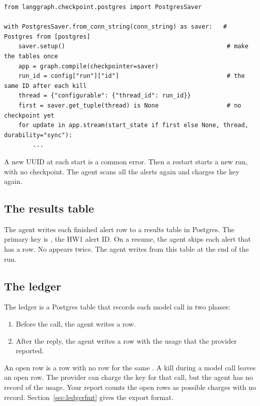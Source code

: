 \documentclass[9pt,letterpaper]{article}
\begin{document}
\begin{verbatim}
from langgraph.checkpoint.postgres import PostgresSaver

with PostgresSaver.from_conn_string(conn_string) as saver:   # Postgres from [postgres]
    saver.setup()                                             # make the tables once
    app = graph.compile(checkpointer=saver)
    run_id = config["run"]["id"]                              # the same ID after each kill
    thread = {"configurable": {"thread_id": run_id}}
    first = saver.get_tuple(thread) is None                   # no checkpoint yet
    for update in app.stream(start_state if first else None, thread, durability="sync"):
        ...
\end{verbatim}

A new UUID at each start is a common error. Then a restart starts a new run, with
no checkpoint. The agent scans all the alerts again and charges the key again.

\subsection{The results table}\label{sec:results}

The agent writes each finished alert row to a results table in Postgres. The
primary key is , the HW1 alert ID. On a resume, the agent skips
each alert that has a row. No  appears twice. The agent writes
 from this table at the end of the run.

\subsection{The ledger}\label{sec:ledger}

The ledger is a Postgres table that records each model call in two phases:
\begin{enumerate}
\item Before the call, the agent writes a  row.
\item After the reply, the agent writes a  row with the usage
  that the provider reported.
\end{enumerate}
An open row is a  row with no  row for
the same . A kill during a model call leaves an open row. The
provider can charge the key for that call, but the agent has no record of the
usage. Your report counts the open rows as possible charges with no record.
Section~\ref{sec:ledgerfmt} gives the export format.
\end{document}
